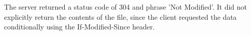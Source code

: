 The server returned a status code of 304 and phrase 'Not Modified'. It did not explicitly return the contents of the file, since the client requested the data conditionally using the If-Modified-Since header.